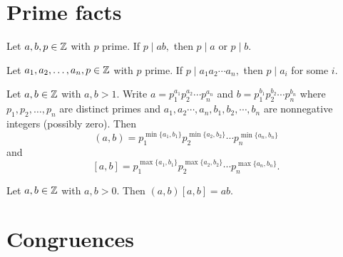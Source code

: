 \documentclass[letterpaper, 11 pt]{ximera}
\begin{document}
\section{Prime facts}\label{sec:additional-primes}

\begin{lemma}[Lemma 1.14]\label{lem:irreducible-prime}
    Let $a,b,p\in\mathbb Z$ with $p$ prime. If $p\mid ab,$ then $p\mid a$ or $p\mid b.$
\end{lemma}

\begin{corollary}[Corollary 1.15]\label{cor:irreducible-prime} Let $a_1,a_2,\dots,a_n,p\in\mathbb Z$ with $p$ prime. If $p\mid a_1a_2\cdots a_n,$ then $p\mid a_i$ for some $i.$
\end{corollary}

\begin{proposition}[Proposition 1.17]\label{prop:form-lcm-gcd}
 Let $a,b\in\mathbb Z$ with $a,b\gt 1.$ Write $a=p_1^{a_1}p_2^{a_2}\cdots  p_n^{a_n}$ and $b=p_1^{b_1}p_2^{b_2}\cdots p_n^{b_n}$ where $p_1,p_2,\dots,p_n$ are distinct primes and ${a_1},{a_2}\cdots,{a_n},{b_1},{b_2},\cdots,{b_n}$ are nonnegative integers (possibly zero). Then
        \[(a,b)=p_1^{\min\{a_1,b_1\}}p_2^{\min\{a_2,b_2\}}\cdots p_n^{\min\{a_n,b_n\}}\]
        and 
        \[[a,b]=p_1^{\max\{a_1,b_1\}}p_2^{\max\{a_2,b_2\}}\cdots p_n^{\max\{a_n,b_n\}}.\]
\end{proposition}

\begin{theorem}[Theorem 1.19]\label{thm:prod-lcm-gcd} Let $a,b\in\mathbb Z$ with $a,b\gt 0.$ Then $(a,b)[a,b]=ab.$
\end{theorem}

\section{Congruences}

            

\end{document}
